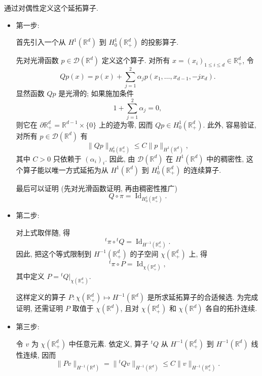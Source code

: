 \begin{Proof}
通过对偶性定义这个延拓算子.

\begin{itemize}
 \item 第一步:

 首先引入一个从 $H^1(\mathbb R^d)$ 到 $H_0^1(\mathbb R_+^d)$ 的投影算子.

 先对光滑函数 $p\in\mathcal D(\mathbb R^d)$ 定义这个算子. 对所有 $x=(x_i)_{1\leq i\leq d}\in\mathbb R_+^d$, 令
 \[
  Qp(x)=p(x)+\sum_{j=1}^2\alpha_jp(x_1,\ldots,x_{d-1},-jx_d).
 \]
 显然函数 $Qp$ 是光滑的; 如果施加条件
 \begin{equation}
  1+\sum_{j=1}^2\alpha_j=0,
  \label{eq:chap4-projection-zero-trace-condition}
 \end{equation}
 则它在 $\partial\mathbb R_+^d=\mathbb R^{d-1}\times\{0\}$ 上的迹为零, 因而 $Qp\in H_0^1(\mathbb R_+^d)$. 此外, 容易验证, 对所有 $p\in\mathcal D(\mathbb R^d)$ 有
 \[
  \|Qp\|_{H_0^1(\mathbb R_+^d)}\leq C\|p\|_{H^1(\mathbb R^d)},
 \]
 其中 $C>0$ 只依赖于 $(\alpha_i)_i$. 因此, 由 $\mathcal D(\mathbb R^d)$ 在 $H^1(\mathbb R^d)$ 中的稠密性, 这个算子能以唯一方式延拓为从 $H^1(\mathbb R^d)$ 到 $H_0^1(\mathbb R_+^d)$ 的连续算子.

 最后可以证明 (先对光滑函数证明, 再由稠密性推广)
 \[
  Q\circ\pi=\operatorname{Id}_{H_0^1(\mathbb R_+^d)}.
 \]

 \item 第二步:

 对上式取伴随, 得
 \[
  {}^{t}\!\pi\circ{}^{t}\!Q=\operatorname{Id}_{H^{-1}(\mathbb R_+^d)}.
 \]
 因此, 把这个等式限制到 $H^{-1}(\mathbb R_+^d)$ 的子空间 $\chi(\mathbb R_+^d)$ 上, 得
 \[
  {}^{t}\!\pi\circ P=\operatorname{Id}_{\chi(\mathbb R_+^d)},
 \]
 其中定义 $P={}^{t}\!Q|_{\chi(\mathbb R_+^d)}$.

 这样定义的算子 $P:\chi(\mathbb R_+^d)\longmapsto H^{-1}(\mathbb R^d)$ 是所求延拓算子的合适候选. 为完成证明, 还需证明 $P$ 取值于 $\chi(\mathbb R^d)$, 且对 $\chi(\mathbb R_+^d)$ 和 $\chi(\mathbb R^d)$ 各自的拓扑连续.

 \item 第三步:

 令 $v$ 为 $\chi(\mathbb R_+^d)$ 中任意元素. 依定义, 算子 ${}^{t}\!Q$ 从 $H^{-1}(\mathbb R_+^d)$ 到 $H^{-1}(\mathbb R^d)$ 线性连续, 因而
 \[
  \|Pv\|_{H^{-1}(\mathbb R^d)}
  =\|{}^{t}\!Qv\|_{H^{-1}(\mathbb R^d)}
  \leq C\|v\|_{H^{-1}(\mathbb R_+^d)}.
 \]


\end{itemize}
\end{Proof}
